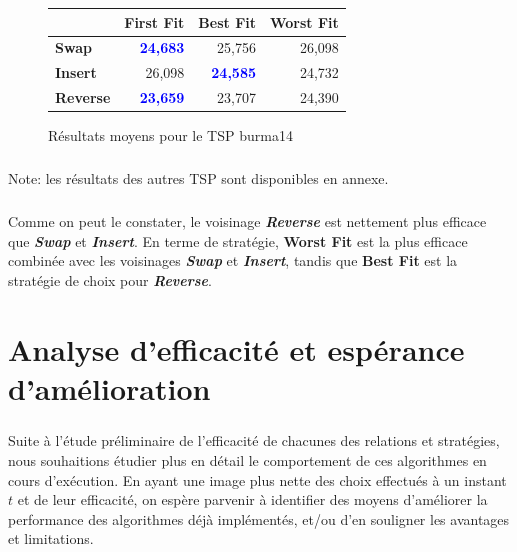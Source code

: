 \documentclass[a4paper,10pt]{report}
\begin{document}
\begin{figure}[H]
  \begin{center}
    \begin{tabular}{|l|r|r|r|}
      \hline
      &		\textbf{First Fit}&	\textbf{Best Fit}&	\textbf{Worst
Fit}\\\hline
      \textbf{Swap}&
	  \textbf{\textcolor{blue}{24,683}}&
	  25,756&
	  26,098\\\hline
      \textbf{Insert}&
	  26,098&
	  \textbf{\textcolor{blue}{24,585}}&
	  24,732\\\hline
      \textbf{Reverse}&
	  \textbf{\textcolor{blue}{23,659}}&
	  23,707&
	  24,390\\\hline
    \end{tabular}
    \label{burma14-results}
    \caption{Résultats moyens pour le TSP burma14}
  \end{center}
\end{figure}

\paragraph{}
Note: les résultats des autres TSP sont disponibles en annexe.

\paragraph{}
  Comme on peut le constater, le voisinage \textbf{\textit{Reverse}} est
nettement plus efficace que \textbf{\textit{Swap}} et \textbf{\textit{Insert}}.
En terme de stratégie, \textbf{Worst Fit} est la plus efficace combinée avec les
voisinages \textbf{\textit{Swap}} et \textbf{\textit{Insert}}, tandis que
\textbf{Best Fit} est la stratégie de choix pour \textbf{\textit{Reverse}}.

\chapter{Analyse d'efficacité et espérance d'amélioration}

\paragraph{}
  Suite à l'étude préliminaire de l'efficacité de chacunes des relations et
stratégies, nous souhaitions étudier plus en détail le comportement de ces
algorithmes en cours d'exécution. En ayant une image plus nette des choix
effectués à un instant $t$ et de leur efficacité, on espère parvenir à
identifier des moyens d'améliorer la performance des algorithmes déjà
implémentés, et/ou d'en souligner les avantages et limitations.
\end{document}
